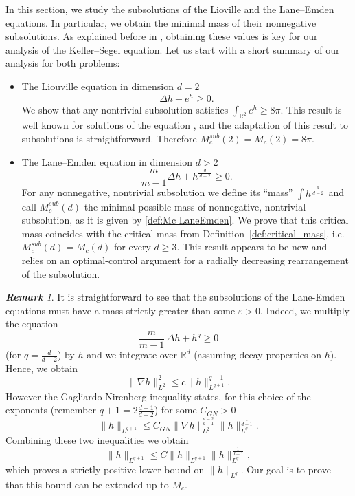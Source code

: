 \documentclass[11pt,a4paper]{article}
\numberwithin{equation}{section}
\newcommand{\R}{{\mathbb{R}}}
\theoremstyle{plain}
\theoremstyle{remark}
\newtheorem{remark}[theorem]{\bf Remark}
\newcommand {\f}{\frac}
\begin{document}
In this section, we study the subsolutions of the Lioville and the Lane--Emden equations. In particular, we obtain the minimal mass of their nonnegative subsolutions. As explained before in , obtaining these values is key for our analysis of the Keller--Segel equation. 
Let us start with a short summary of our analysis for both problems: 


\begin{itemize}
\item The Liouville equation in dimension $d=2$
\[
    \Delta h  +  e^{h}  \ge  0.
\]
We show that any nontrivial subsolution satisfies $\int_{\R^2} e^h\ge 8\pi$. This result is well known for solutions of the equation \cite[Lemma 1.1]{Chen_Li91}, and the adaptation of this result to subsolutions is straightforward. Therefore $M_c^{sub}(2)=M_c(2)=8\pi$.
\item The Lane--Emden equation in dimension $d>2$
\[
\f{m}{m-1}\Delta h  +  h^{\f{d}{\,d-2\,}}  \ge  0.
\]
For any nonnegative, nontrivial subsolution we define its ``mass'' $\int h^{\f{d}{\,d-2\,}}$ and call $M_c^{sub}(d)$ the minimal possible mass of nonnegative, nontrivial subsolution, as it is given by \eqref{def:Mc LaneEmden}. We prove that this critical mass coincides with the critical mass from Definition~\ref{def:critical_mass}, i.e.  $M_c^{sub}(d)=M_{c}(d)$ for every $d\geq 3$.%
This result appears to be new and relies on an optimal-control argument for a radially decreasing rearrangement of the subsolution.  
\end{itemize}

\begin{remark}
It is straightforward to see that the subsolutions of the Lane-Emden equations must have a mass strictly greater than some $\varepsilon>0$. Indeed, we multiply the equation
\[
\frac{m}{m-1}\,\Delta h + h^q \ge 0
\]
(for $q=\f{d}{d-2}$)
by $h$ and we integrate over $\R^d$ (assuming decay properties on $h$). Hence, we obtain 
$$
\|\nabla h\|_{L^{2}}^2\le c\|h\|_{L^{q+1}}^{q+1}.
$$
However the Gagliardo-Nirenberg inequality states, for this choice of the exponents (remember $q+1=2\f{d-1}{d-2}$) for some $C_{GN}>0$
$$
\|h\|_{L^{q+1}}\le C_{GN} \|\nabla h\|_{L^{2}}^{\f{d-2}{d-1}}\|h\|_{L^q}^{\f{1}{d-1}}.
$$
Combining these two inequalities we obtain
$$\|h\|_{L^{q+1}}\le C\|h\|_{L^{q+1}}\|h\|_{L^q}^{\f{1}{d-1}},
$$
which proves a strictly positive lower bound on $\|h\|_{L^q}$.
Our goal is to prove that this bound can be extended up to  $M_c$.   
\end{remark}
\end{document}
